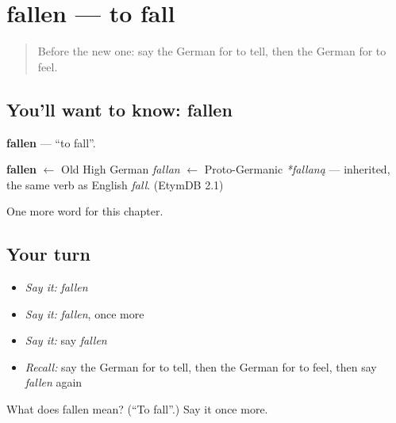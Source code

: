 \section[fallen]{fallen — to fall}

\label{lesson:GE-C140-fallen}



\begin{quote}
Before the new one: say the German for to tell, then the German for to feel.
\end{quote}

\subsection*{You'll want to know: fallen}
\textbf{fallen} — \textquotedblleft{}to fall\textquotedblright{}.

\begin{cousinweb}
\textbf{fallen} $\leftarrow$ Old High German \emph{fallan} $\leftarrow$ Proto-Germanic \emph{*fallaną} — inherited, the same verb as English \emph{fall}. (EtymDB 2.1)
\end{cousinweb}

\begin{grammarlens}[title={What you've built}]
One more word for this chapter.
\end{grammarlens}

\subsection*{Your turn}
\begin{itemize}
\raggedright
  \item \emph{Say it:} \emph{fallen}
  \item \emph{Say it:} \emph{fallen}, once more
  \item \emph{Say it:} say \emph{fallen}
  \item \emph{Recall:} say the German for to tell, then the German for to feel, then say \emph{fallen} again
\end{itemize}

\begin{tcolorbox}[breakable,colback=teal!4,colframe=teal!35!black,title={Before you move on}]
What does fallen mean? (\textquotedblleft{}To fall\textquotedblright{}.) Say it once more.
\end{tcolorbox}
